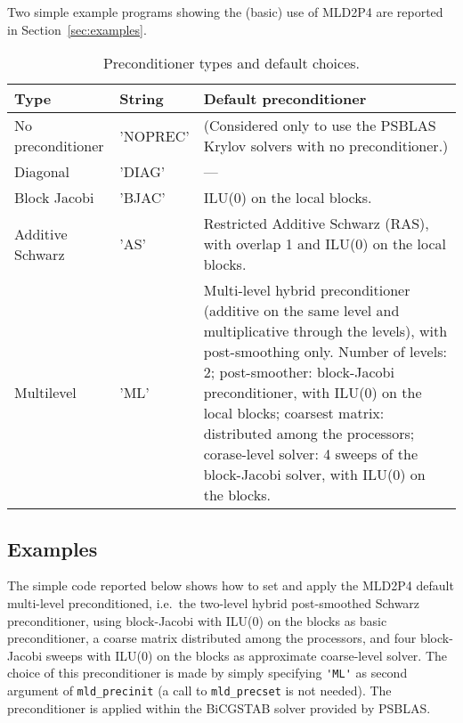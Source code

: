 Two simple example programs showing the (basic) use of MLD2P4 are reported in
Section~\ref{sec:examples}.

\begin{table}[th]
{
\begin{center}
\begin{tabular}{|l|l|p{6.7cm}|}
\hline
Type              & String & Default preconditioner \\ \hline
No preconditioner &'NOPREC'& (Considered only to use the PSBLAS
                             Krylov solvers with no preconditioner.) \\
Diagonal          & 'DIAG' & --- \\
Block Jacobi      & 'BJAC' & ILU(0) on the local blocks.\\ 
Additive Schwarz  & 'AS'   & Restricted Additive Schwarz (RAS),
                             with overlap 1 and ILU(0) on the local blocks. \\ 
Multilevel        &'ML'    & Multi-level hybrid preconditioner (additive on the
                             same level and multiplicative through the levels),
                             with post-smoothing only. Number of levels: 2;
                             post-smoother: block-Jacobi preconditioner, with ILU(0)
                             on the local blocks; coarsest matrix: distributed among the
                             processors; corase-level solver: 4 sweeps of the
                             block-Jacobi solver, with ILU(0) on the blocks. \\
\hline
\end{tabular}
\end{center}
}
\caption{Preconditioner types and default choices.\label{tab:precinit}}
\end{table}

\subsection{Examples\label{sec:examples}}

The simple code reported below shows how to set and apply the MLD2P4 default multi-level
preconditioned, i.e.\ the two-level hybrid post-smoothed Schwarz preconditioner, using block-Jacobi with ILU(0) on the blocks as basic preconditioner,
a coarse matrix distributed among the processors, and four block-Jacobi sweeps with ILU(0) on the blocks as approximate coarse-level solver. The choice of this preconditioner is made
by simply specifying \verb|'ML'| as second argument of \verb|mld_precinit|
(a call to \verb|mld_precset| is not needed).
The preconditioner is applied within the BiCGSTAB solver provided by PSBLAS. 

